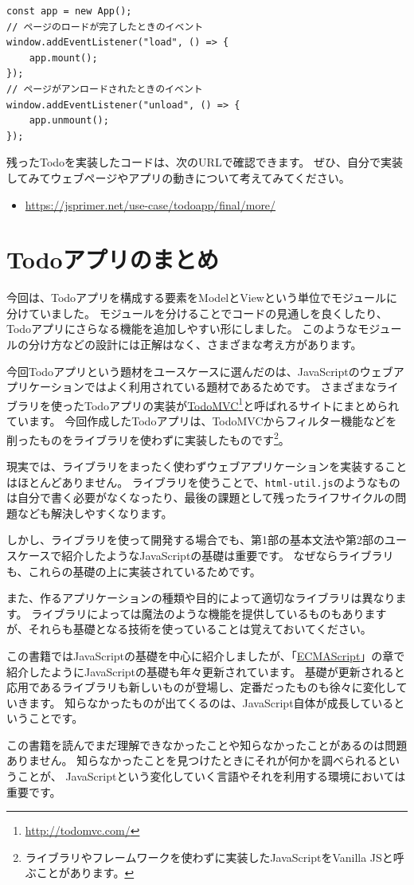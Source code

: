 \begin{lstlisting}
const app = new App();
// ページのロードが完了したときのイベント
window.addEventListener("load", () => {
    app.mount();
});
// ページがアンロードされたときのイベント
window.addEventListener("unload", () => {
    app.unmount();
});
\end{lstlisting}

残ったTodoを実装したコードは、次のURLで確認できます。
ぜひ、自分で実装してみてウェブページやアプリの動きについて考えてみてください。

\begin{itemize}
\item
  \url{https://jsprimer.net/use-case/todoapp/final/more/}
\end{itemize}

\hypertarget{todo-conclusion}{%
\section{Todoアプリのまとめ}\label{todo-conclusion}}

今回は、Todoアプリを構成する要素をModelとViewという単位でモジュールに分けていました。
モジュールを分けることでコードの見通しを良くしたり、Todoアプリにさらなる機能を追加しやすい形にしました。
このようなモジュールの分け方などの設計には正解はなく、さまざまな考え方があります。

今回Todoアプリという題材をユースケースに選んだのは、JavaScriptのウェブアプリケーションではよく利用されている題材であるためです。
さまざまなライブラリを使ったTodoアプリの実装が\href{http://todomvc.com/}{TodoMVC}\footnote{\url{http://todomvc.com/}}と呼ばれるサイトにまとめられています。
今回作成したTodoアプリは、TodoMVCからフィルター機能などを削ったものをライブラリを使わずに実装したものです\footnote{ライブラリやフレームワークを使わずに実装したJavaScriptをVanilla JSと呼ぶことがあります。}。

現実では、ライブラリをまったく使わずウェブアプリケーションを実装することはほとんどありません。
ライブラリを使うことで、\texttt{html-util.js}のようなものは自分で書く必要がなくなったり、最後の課題として残ったライフサイクルの問題なども解決しやすくなります。

しかし、ライブラリを使って開発する場合でも、第1部の基本文法や第2部のユースケースで紹介したようなJavaScriptの基礎は重要です。
なぜならライブラリも、これらの基礎の上に実装されているためです。

また、作るアプリケーションの種類や目的によって適切なライブラリは異なります。
ライブラリによっては魔法のような機能を提供しているものもありますが、それらも基礎となる技術を使っていることは覚えておいてください。

この書籍ではJavaScriptの基礎を中心に紹介しましたが、「\hyperlink{ecmascript}{ECMAScript}」の章で紹介したようにJavaScriptの基礎も年々更新されています。
基礎が更新されると応用であるライブラリも新しいものが登場し、定番だったものも徐々に変化していきます。
知らなかったものが出てくるのは、JavaScript自体が成長しているということです。

この書籍を読んでまだ理解できなかったことや知らなかったことがあるのは問題ありません。
知らなかったことを見つけたときにそれが何かを調べられるということが、
JavaScriptという変化していく言語やそれを利用する環境においては重要です。
